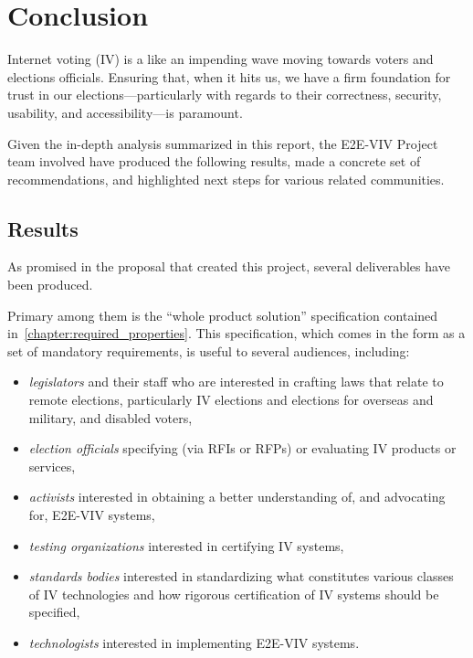\chapter{Conclusion}
\label{chapter:conclusion}

Internet voting (IV) is a like an impending wave moving towards voters and elections
officials.  Ensuring that, when it hits us, we have a firm foundation
for trust in our elections---particularly with regards to their
correctness, security, usability, and accessibility---is paramount.

Given the in-depth analysis summarized in this report, the E2E-VIV
Project team involved have produced the following
results, made a concrete set of recommendations, and highlighted next
steps for various related communities.

\section{Results}

As promised in the proposal that created this project,
several deliverables have been produced.  

Primary among them is the ``whole product solution'' specification
contained in~\autoref{chapter:required_properties}. This
specification, which comes in the form as a set of mandatory
requirements, is useful to several audiences, including:
\begin{itemize}
\item \emph{legislators} and their staff who are interested in
  crafting laws that relate to remote elections, particularly IV
  elections and elections for overseas and military, and disabled voters,
\item \emph{election officials} specifying (via RFIs or RFPs) or
  evaluating IV products or services,
\item \emph{activists} interested in obtaining a better understanding
  of, and advocating for, E2E-VIV systems,
\item \emph{testing organizations} interested in certifying IV
  systems,
\item \emph{standards bodies} interested in standardizing what
  constitutes various classes of IV technologies and how rigorous
  certification of IV systems should be specified,
\item \emph{technologists} interested in implementing E2E-VIV systems.
\end{itemize}

